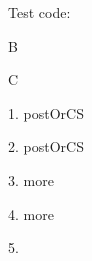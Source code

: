 \documentclass[12pt]{amsart}
\begin{document}
\let\CNLexpand=\ignoreOptionOrCS
\let\CNLnoexpand=\ignoreOptionOrCS
\let\CNLdelete=\ignoreOptionOrCS
\let\CNLcustom=\ignoreOptionOrCSS

Test code:

\ignoreOptionAndCS[3]\onearg
B

\ignoreOne\onearg C


1. \ignoreOptionOrCS\onearg postOrCS


2.  \ignoreOptionOrCS[4]\onearg postOrCS 

3. \ignoreOptionOrCSS[3] more

4. \ignoreOptionOrCSS{} more

5.

\CNLdelete\alpha
\CNLexpand\beta
\CNLnoexpand\gamma
\CNLcustom{}

\CNLdelete[1]\alpha
\CNLexpand[2]\beta
\CNLnoexpand[3]\gamma
\CNLcustom[4]
\end{document}
